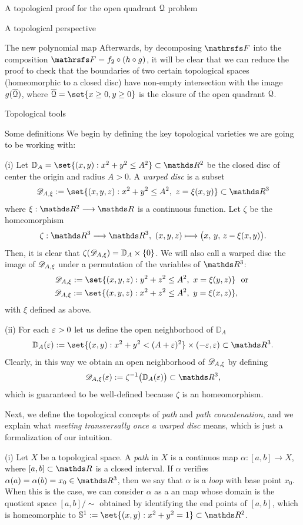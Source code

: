 \documentclass[11pt, a4paper, english, twoside, notitlepage, openright]{report}
\begin{document}
\begin{chapter}{A topological proof for the open quadrant $\mathcal{Q}$ problem}
\begin{section}{A topological perspective}
\begin{subsection}{The new polynomial map}
Afterwards, by decomposing $\FFF$ into the composition $\FFF = f_2 \circ (h \circ g)$, it will be clear that we can reduce the proof to check that the boundaries of two certain topological spaces (homeomorphic to a closed disc) have non-empty intersection with the image $g(\overline{\mathcal{Q}})$, where $\overline{\Qu} = \set{x \ge 0, y \ge 0}$ is the closure of the open quadrant $\mathcal{Q}$.
\end{subsection}
\end{section}
\begin{section}{Topological tools}
\begin{subsection}{Some definitions}
We begin by defining the key topological varieties we are going to be working with:
\begin{definitions}
(i) Let ${\mathbb D}_A = \set{(x,y): x^2+y^2 \le A^2} \subset \R^2$ be the closed disc of center the origin and radius $A>0$. A \textit{warped disc} is a subset 
$$\D_{A,\xi}:=\set{(x,y,z): x^2+y^2\le A^2,\ z=\xi(x,y)}\subset\R^3$$
where $\xi:\R^2\longrightarrow\R$ is a continuous function. Let $\zeta$ be the homeomorphism
$$
\zeta:\R^3\longrightarrow\R^3,\ (x,y,z)\longmapsto\big(x,\, y,\, z-\xi(x,y)\big).
$$
Then, it is clear that $\zeta(\mathscr{D}_{A,\xi}) = {\mathbb D}_A\times\{0\}$. We will also call a warped disc the image of $\mathscr{D}_{A,\xi}$ under a permutation of the variables of $\R^3$:
\begin{equation*}
\begin{aligned}
\D_{A,\xi}:=\set{(x,y,z): y^2+z^2\le A^2,\ x=\xi(y,z)}& \ \text{ or } \\
\D_{A,\xi}:=\set{(x,y,z): x^2+z^2\le A^2,\ y=\xi(x,z)}&,
\end{aligned}
\end{equation*}
with $\xi$ defined as above.

(ii) For each $\varepsilon>0$ let us define the open neighborhood of ${\mathbb D}_A$
$$
{\mathbb D}_A(\eps):=\set{(x,y):x^2+y^2<(A+\eps)^2}\times(-\eps,\eps)\subset\R^3.
$$ 
Clearly, in this way we obtain an open neighborhood of $\mathscr{D}_{A,\xi}$ by defining 
$$
\D_{A,\xi}(\eps):=\zeta^{-1}\big({\mathbb D}_A(\eps)\big) \subset \R^3,
$$
which is guaranteed to be well-defined because $\zeta$ is an homeomorphism.
\end{definitions}

Next, we define the topological concepts of \emph{path} and \emph{path concatenation}, and we explain what \emph{meeting transversally once a warped disc} means, which is just a formalization of our intuition.
\begin{definitions}
(i) Let $X$ be a topological space. A \emph{path} in $X$ is a continuos map $\alpha:[a, b] \to X$, where $[a,b] \subset \R$ is a closed interval. If $\alpha$ verifies $\alpha(a) = \alpha(b) = x_0 \in \R^3$, then we say that $\alpha$ is a \emph{loop} with base point $x_0$. When this is the case, we can consider $\alpha$ as a an map whose domain is the quotient space $[a,b]/\! \sim$ obtained by identifying the end points of $[a,b]$, which is homeomorphic to $\mathbb{S}^1 := \set{(x,y): x^2+y^2=1} \subset \R^2$.


\end{definitions}
\end{subsection}
\end{section}
\end{chapter}
\end{document}
